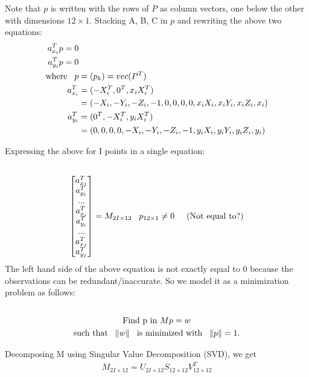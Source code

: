 \documentclass[a4paper]{article}
\begin{document}
Note that $p$ is written with the rows of $P$ as column vectors, one below the other with dimensions $12\times 1$. Stacking A, B, C in $p$ and rewriting the above two equations:
\begin{align*} \label{eqn5}
a^T_{{x}_{i}} p = 0 &\\
a^T_{{y}_{i}} p = 0 &\\
\text{where} \hspace{3mm}
 p &= (p_{k}) = vec(P^T) \\
a^T_{{x}_{i}} &= (-X^T_{i},0^T,x_{i} X^T_{i})
\\ &= (-X_{i}, -Y_{i}, -Z_{i}, -1, 0,0,0,0, x_{i}X_{i}, x_{i}Y_{i}, x_{i}Z_{i}, x_{i})
\\ a^T_{{y}_{i}} &= (0^T,-X^T_{i},y_{i} X^T_{i})
\\ &= (0,0,0,0, -X_{i}, -Y_{i}, -Z_{i}, -1,  y_{i}X_{i}, y_{i}Y_{i}, y_{i}Z_{i}, y_{i})
\end{align*}


Expressing the above for I points in a single equation:
\begin{align*}
\\ \begin{bmatrix}a^T_{{x}_{1}}\\ a^T_{{y}_{1}}\\...\\ a^T_{{x}_{i}}\\ a^T_{{y}_{i}}\\...\\ a^T_{{x}_{I}}\\a^T_{{y}_{I}}\end{bmatrix} = M_{2I\times12} \hspace{3mm} p_{12\times1} 	\neq 0 \hspace{5mm} \text{(Not equal to?)} 
\end{align*}
The left hand side of the above equation is not exactly equal to 0 because the observations can be redundant/inaccurate. So we model it as a minimization problem as follows:
\begin{gather*}
\\\text{Find p in  }M p = w
\\\text{such that}  \hspace{3mm} \|w\| \hspace{3mm} \text{is minimized with} \hspace{3mm} \|p\| = 1.
\\
\end{gather*}

Decomposing M using Singular Value Decomposition (SVD), we get
\begin{align*}
M_{2I\times12} = U_{2I\times12} S_{12\times12} {V^T_{12\times12}}
\end{align*}
\end{document}
